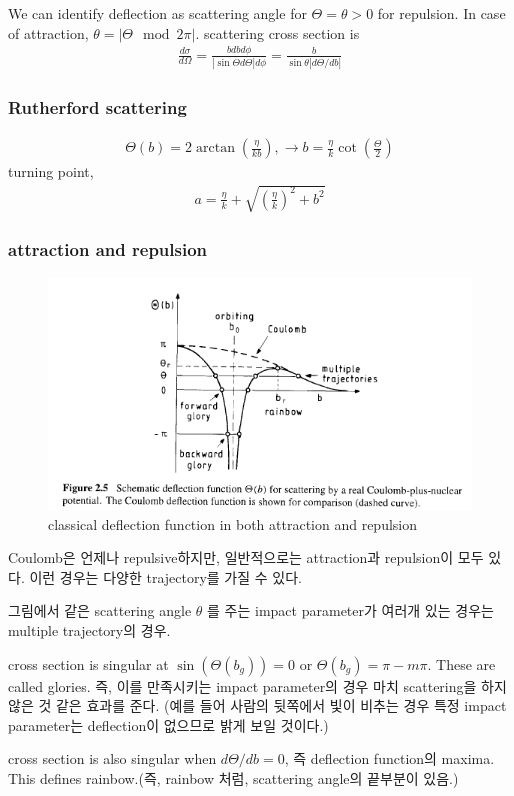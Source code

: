 \documentclass[10pt]{book}
\newcommand{\bea}{\begin{eqnarray}}
\newcommand{\eea}{\end{eqnarray}}
\begin{document}
We can identify deflection as scattering angle for $\Theta=\theta>0$ for repulsion.
In case of attraction, $\theta=|\Theta\mod 2\pi|$. scattering cross section is
\bea 
\frac{d\sigma}{d\Omega} = \frac{b db d\phi}{|\sin\Theta d\Theta|d\phi}
                        = \frac{b}{\sin\theta|d\Theta/d b|}
\eea 

\subsubsection{Rutherford scattering}
\bea 
\Theta(b)=2\arctan(\frac{\eta}{kb}),\to b =\frac{\eta}{k}\cot(\frac{\Theta}{2})
\eea 
turning point,
\bea 
a = \frac{\eta}{k}+\sqrt{(\frac{\eta}{k})^2+b^2}
\eea 
\subsubsection{attraction and repulsion}
\begin{figure}
	\centering
	\includegraphics[width=0.7\linewidth]{figs/classical_deflection_function}
	\caption{classical deflection function in both attraction and repulsion}
	\label{fig:classicaldeflectionfunction}
\end{figure}
Coulomb은 언제나 repulsive하지만, 일반적으로는 attraction과 repulsion이 모두 있다. 
이런 경우는 다양한 trajectory를 가질 수 있다. 

그림에서 같은 scattering angle $\theta$ 를 주는 impact parameter가 여러개 있는 경우는 
multiple trajectory의 경우. 

cross section is singular at $\sin(\Theta(b_g))=0$
or $\Theta(b_g)=\pi-m\pi$. These are called {\color{red}glories}. 
즉, 이를 만족시키는 impact parameter의 경우 마치 scattering을 하지 않은 것 같은 효과를 준다.
(예를 들어 사람의 뒷쪽에서 빛이 비추는 경우 특정 impact parameter는 deflection이 없으므로
밝게 보일 것이다.)

cross section is also singular when $d\Theta/db=0$, 즉 deflection function의 maxima. 
This defines {\color{red} rainbow}.(즉, rainbow 처럼, scattering angle의 끝부분이 있음.)
\end{document}
